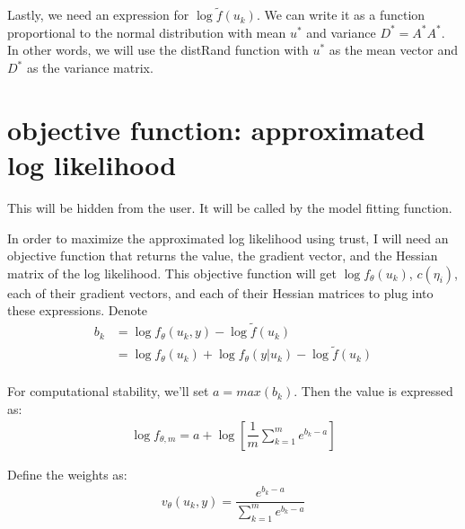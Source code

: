 \documentclass{article}
\begin{document}
Lastly, we need an expression for $\log \tilde{f} (u_k)$. We can write it as a function proportional to the normal distribution with mean $u^*$ and variance $D^*=A^*A^*$.  In other words, we will use the distRand function with $u^*$ as the mean vector and $D^*$ as the variance matrix.


\section{objective function: approximated log likelihood}
This will be hidden from the user. It will be called by the model fitting function.

In order to maximize the approximated log likelihood using trust, I will need an objective function that returns the value, the gradient vector, and the Hessian matrix of the log likelihood.  This objective function will get $\log f_\theta (u_k)$, $c(\eta_i)$, each of their gradient vectors, and each of their Hessian matrices to plug into these expressions.    Denote\\
\begin{align}
b_k &=  \log f_\theta (u_k,y)- \log \tilde{f} (u_k) \\
&= \log f_\theta (u_k) + \log f_\theta (y|u_k) - \log \tilde{f} (u_k) \\
\end{align}


For computational stability, we'll set $a=max(b_k)$. Then the value is expressed as:\\
\begin{align}
\log f_{\theta,m} = a+ \log \left[ \dfrac{1}{m}  \sum_{k=1}^m e^{b_k-a} \right]
\end{align}

Define the weights as:\\
\begin{align}
v_\theta(u_k,y) = \dfrac{e^{b_k-a}}{ \sum_{k=1}^m e^{b_k-a}} 
\end{align}
\end{document}
